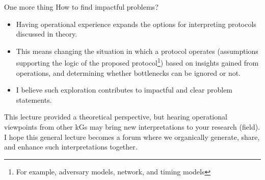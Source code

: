 \documentclass[aspectratio=169,10pt]{beamer}
\newenvironment{outlineblock}[1][]
{\begin{tcolorbox}[colframe=black, colback=white, boxrule=1pt, boxsep=5pt]}
{\end{tcolorbox}}
\begin{document}
\begin{frame}{One more thing}
How to find impactful problems?
\begin{outlineblock}
    \begin{itemize}
        \item Having operational experience expands the options for interpreting protocols discussed in theory.
        \item This means changing the situation in which a protocol operates (assumptions supporting the logic of the proposed protocol\footnote{For example, adversary models, network, and timing models}) based on insights gained from operations, and determining whether bottlenecks can be ignored or not.
        \item I believe such exploration contributes to impactful and clear problem statements.
    \end{itemize}
\end{outlineblock}
This lecture provided a theoretical perspective, but hearing operational viewpoints from other kGs may bring new interpretations to your research (field).
I hope this general lecture becomes a forum where we organically generate, share, and enhance such interpretations together.
\end{frame}

\end{document}

